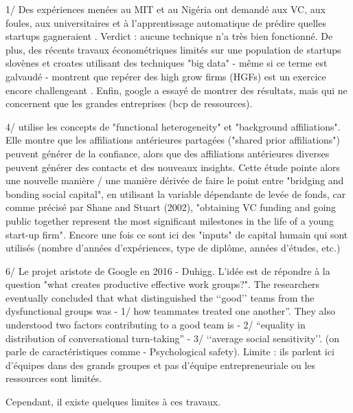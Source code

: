 \documentclass[12pt]{article}
\begin{document}
1/ Des expériences menées au MIT et au Nigéria ont demandé aux VC, aux foules, aux universitaires et à l'apprentissage automatique de prédire quelles startups gagneraient \citep{ghassemiautomated}. Verdict : aucune technique n'a très bien fonctionné. De plus, des récents travaux économétriques limités sur une population de startups slovènes et croates utilisant des techniques "big data" - même si ce terme est galvaudé - montrent que repérer des high grow firms (HGFs) est un exercice encore challengeant \citep{coad2020catching}. Enfin, google a essayé de montrer des résultats, mais qui ne concernent que les grandes entreprises (bcp de ressources).


4/ \citep{beckman2007early} utilise les concepts de "functional heterogeneity" et "background affiliations". Elle montre que les affiliations antérieures partagées ("shared prior affiliations") peuvent générer de la confiance, alors que des affiliations antérieures diverses peuvent générer des contacts et des nouveaux insights. Cette étude pointe alors une nouvelle manière / une manière dérivée de faire le point entre "bridging and bonding social capital", en utilisant la variable dépendante de levée de fonds, car comme précisé par Shane and Stuart (2002), "obtaining VC funding and going public together represent the most significant milestones in the life of a young start-up firm". Encore une fois ce sont ici des "inputs" de capital humain qui sont utilisés (nombre d'années d'expériences, type de diplôme, années d'études, etc.)

6/ Le projet aristote de Google en 2016 - Duhigg. L'idée est de répondre à la question "what creates productive effective work groups?". The researchers eventually concluded that what distinguished the ‘‘good’’ teams from the dysfunctional groups was -	1/ how teammates treated one another”. They also understood two factors contributing to a good team is -	2/ “equality in distribution of conversational turn-taking” -	3/ ‘‘average social sensitivity’’. (on parle de caractéristiques comme -	Psychological safety). Limite : ils parlent ici d'équipes dans des grands groupes et pas d'équipe entrepreneuriale ou les ressources sont limités.

Cependant, il existe quelques limites à ces travaux.
\end{document}
